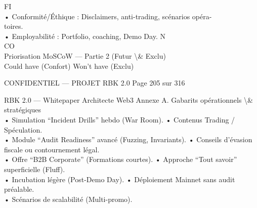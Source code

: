 \documentclass[12pt,landscape,a4paper]{article}
\newenvironment{confidential}
{\begin{tcolorbox}[
    colback=rbkred!5!white,
    colframe=rbkred!75!black,
    title=CONFIDENTIEL,
    fonttitle=\bfseries\color{white},
    coltitle=rbkred!75!black,
    breakable,
    enhanced,
    frame hidden,
    borderline west={2pt}{0pt}{rbkred!75!black}
]}
{\end{tcolorbox}}
\begin{document}
\vspace{0.5em}
\vspace{0.5em}
\vspace{0.5em}
\vspace{0.5em}
FI\\
• Conformité/Éthique : Disclaimers, anti-trading, scénarios opéra-\\
toires.\\
• Employabilité : Portfolio, coaching, Demo Day. N\\
CO\\
\vspace{0.5em}
Priorisation MoSCoW — Partie 2 (Futur \textbackslash{}& Exclu)\\
\vspace{0.5em}
\vspace{0.5em}
Could have (Confort)                                                    Won’t have (Exclu)\\
\vspace{0.5em}
\vspace{0.5em}
\vspace{0.5em}
\vspace{0.5em}
\begin{confidential}CONFIDENTIEL — PROJET RBK 2.0                                   Page 205 sur 316\end{confidential}
RBK 2.0 — Whitepaper Architecte Web3                                                           Annexe A. Gabarits opérationnels \textbackslash{}& stratégiques\\
\vspace{0.5em}
\vspace{0.5em}
\vspace{0.5em}
• Simulation “Incident Drills” hebdo (War Room).                   • Contenus Trading / Spéculation.\\
• Module “Audit Readiness” avancé (Fuzzing, Invariants).           • Conseils d’évasion fiscale ou contournement légal.\\
• Offre “B2B Corporate” (Formations courtes).                      • Approche “Tout savoir” superficielle (Fluff).\\
• Incubation légère (Post-Demo Day).                               • Déploiement Mainnet sans audit préalable.\\
• Scénarios de scalabilité (Multi-promo).\\
\vspace{0.5em}
\vspace{0.5em}
\vspace{0.5em}
\end{document}
